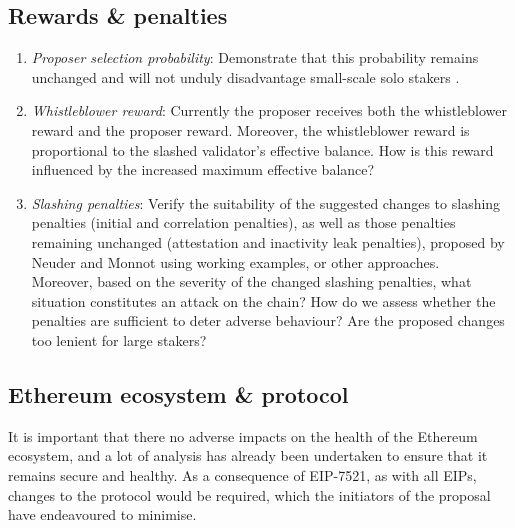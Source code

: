 \documentclass[UTF8]{article}
\begin{document}
\subsection{Rewards \& penalties}
\begin{enumerate}

\item \textit{Proposer selection probability}: Demonstrate that this  probability remains unchanged and will not unduly disadvantage small-scale solo stakers \cite{Neuder2023a}. 

\item \textit{Whistleblower reward}: Currently the proposer receives both the whistleblower reward and the proposer reward. Moreover, the whistleblower reward is proportional to the slashed validator's effective balance. How is this reward influenced by the increased maximum effective balance?	

\item \textit{Slashing penalties}: Verify the suitability of the suggested changes to slashing penalties (initial and correlation penalties), as well as those penalties remaining unchanged (attestation and inactivity leak penalties), proposed by Neuder and Monnot \cite{Neuder2023d} using working examples, or other approaches.\\
Moreover, based on the severity of the changed slashing penalties, what situation constitutes an attack on the chain? How do we assess whether the penalties are sufficient to deter adverse behaviour? Are the proposed changes too lenient for large stakers?


\end{enumerate}

\subsection{Ethereum ecosystem \& protocol}
It is important that there no adverse impacts on the health of the Ethereum ecosystem, and a lot of analysis has already been undertaken to ensure that it remains secure and healthy. As a consequence of EIP-7521, as with all EIPs, changes to the protocol would be required, which the initiators of the proposal have endeavoured to minimise.
\end{document}
